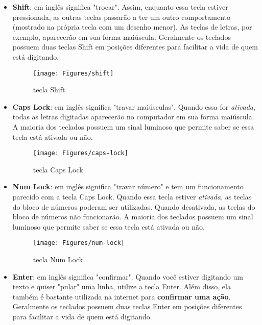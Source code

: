 \documentclass[hidelinks,12pt]{article}
\begin{document}
\begin{itemize}
    
	\item { \textbf{Shift}: em inglês significa "trocar". Assim, enquanto essa tecla estiver pressionada, as outras teclas passarão a ter um outro comportamento (mostrado na própria tecla com um desenho menor). As teclas de letras, por exemplo, aparecerão em sua forma maiúscula. Geralmente os teclados possuem duas teclas Shift em posições diferentes para facilitar a vida de quem está digitando. 
	 
	 \begin{figure}[!h]
	    \centering
		\texttt{[image: Figures/shift]}
		\label{fig:shift}
		\caption{tecla Shift}
	\end{figure}
	}
	
	\item{ \textbf{Caps Lock}: em inglês significa "travar maiúsculas". Quando essa for \emph{ativada}, todas as letras digitadas aparecerão no computador em sua forma maiúscula. A maioria dos teclados possuem um sinal luminoso que permite saber se essa tecla está ativada ou não.
	
    \begin{figure}[!h]
	    \centering
		\texttt{[image: Figures/caps-lock]}
		\label{fig:caps-lock}
		\caption{tecla Caps Lock}
	\end{figure}
    }
    
    \item { \textbf{Num Lock}: em inglês significa "travar número" e tem um funcionamento parecido com a tecla Caps Lock. Quando essa tecla estiver \emph{ativada}, as teclas do bloco de números poderam ser utilizadas. Quando desativada, as teclas do bloco de números não funcionarão. A maioria dos teclados possuem um sinal luminoso que permite saber se essa tecla está ativada ou não.

    \begin{figure}[!h]
	    \centering
		\texttt{[image: Figures/num-lock]}
		\label{fig:num-lock}
		\caption{tecla Num Lock}
	\end{figure}
	}
	
	\item { \textbf{Enter}: em inglês significa "confirmar". Quando você estiver digitando um texto e quiser "pular" uma linha, utilize a tecla Enter. Além disso, ela também é bastante utilizada na internet para \textbf{confirmar uma ação}. Geralmente os teclados possuem duas teclas Enter em posições diferentes para facilitar a vida de quem está digitando.
	
}
\end{itemize}
\end{document}

